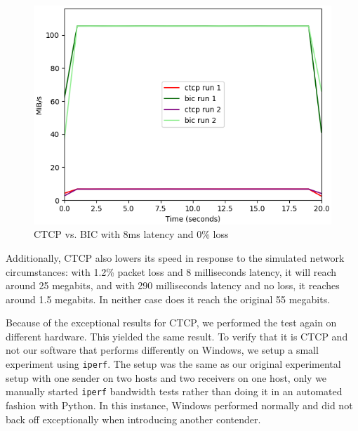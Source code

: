 \documentclass{article}
\begin{document}
\begin{figure}[H]
	\centering
		\includegraphics[scale=0.4]{figs/ctcp-bic-8-0.png}
		\caption{CTCP vs. BIC with 8ms latency and 0\% loss}
	\label{fig:ctcp-1}
\end{figure}

Additionally, CTCP also lowers its speed in response to the simulated network
circumstances: with 1.2\% packet loss and 8 milliseconds latency, it will reach
around 25 megabits, and with 290 milliseconds latency and no loss, it reaches
around 1.5 megabits. In neither case does it reach the original 55 megabits.

Because of the exceptional results for CTCP, we performed the test again on
different hardware. This yielded the same result. To verify that it is CTCP and
not our software that performs differently on Windows, we setup a small
experiment using \texttt{iperf}. The setup was the same as our original
experimental setup with one sender on two hosts and two receivers on one host,
only we manually started \texttt{iperf} bandwidth tests rather than doing it in
an automated fashion with Python. In this instance, Windows performed normally
and did not back off exceptionally when introducing another contender.
\end{document}
